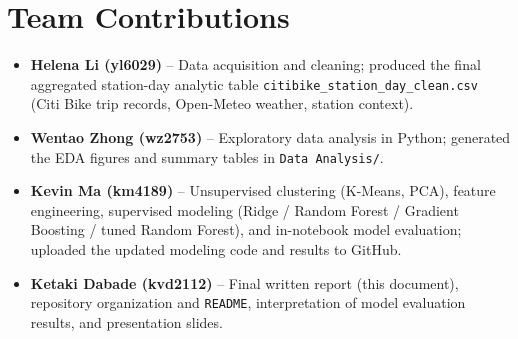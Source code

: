 \documentclass[11pt]{article}
\begin{document}
\section{Team Contributions}

\begin{itemize}[leftmargin=1.4em]
  \item \textbf{Helena Li (yl6029)} -- Data acquisition and cleaning;
        produced the final aggregated station-day analytic table
        \texttt{citibike\_station\_day\_clean.csv} (Citi Bike trip records,
        Open-Meteo weather, station context).
  \item \textbf{Wentao Zhong (wz2753)} -- Exploratory data analysis in
        Python; generated the EDA figures and summary tables in
        \texttt{Data Analysis/}.
  \item \textbf{Kevin Ma (km4189)} -- Unsupervised clustering (K-Means,
        PCA), feature engineering, supervised modeling (Ridge / Random
        Forest / Gradient Boosting / tuned Random Forest), and in-notebook
        model evaluation; uploaded the updated modeling code and results
        to GitHub.
  \item \textbf{Ketaki Dabade (kvd2112)} -- Final written report (this
        document), repository organization and \texttt{README},
        interpretation of model evaluation results, and presentation
        slides.
\end{itemize}
\end{document}
